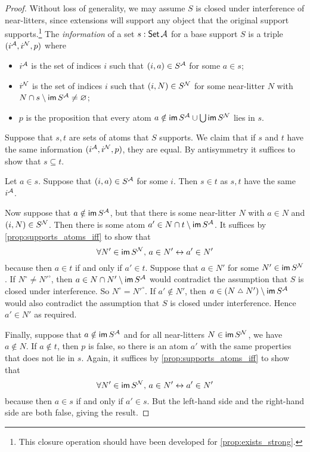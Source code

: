 \begin{proof}
  Without loss of generality, we may assume \( S \) is closed under interference of near-litters, since extensions will support any object that the original support supports.\footnote{This closure operation should have been developed for \cref{prop:exists_strong}.}
  The \emph{information} of a set \( s : \operatorname{\mathsf{Set}} {\mathcal A} \) for a base support \( S \) is a triple \( (i^{\mathcal A}, i^{\mathcal N}, p) \) where
  \begin{itemize}
    \item \( i^{\mathcal A} \) is the set of indices \( i \) such that \( (i, a) \in S^{\mathcal A} \) for some \( a \in s \);
    \item \( i^{\mathcal N} \) is the set of indices \( i \) such that \( (i, N) \in S^{\mathcal N} \) for some near-litter \( N \) with \( N \cap s \setminus \operatorname{\mathsf{im}} S^{\mathcal A} \neq \varnothing \);
    \item \( p \) is the proposition that every atom \( a \notin \operatorname{\mathsf{im}} S^{\mathcal A} \cup \bigcup \operatorname{\mathsf{im}} S^{\mathcal N} \) lies in \( s \).
  \end{itemize}
  Suppose that \( s, t \) are sets of atoms that \( S \) supports.
  We claim that if \( s \) and \( t \) have the same information \( (i^{\mathcal A}, i^{\mathcal N}, p) \), they are equal.
  By antisymmetry it suffices to show that \( s \subseteq t \).

  Let \( a \in s \).
  Suppose that \( (i, a) \in S^{\mathcal A} \) for some \( i \).
  Then \( s \in t \) as \( s, t \) have the same \( i^{\mathcal A} \).

  Now suppose that \( a \notin \operatorname{\mathsf{im}} S^{\mathcal A} \), but that there is some near-litter \( N \) with \( a \in N \) and \( (i, N) \in S^{\mathcal N} \).
  Then there is some atom \( a' \in N \cap t \setminus \operatorname{\mathsf{im}} S^{\mathcal A} \).
  It suffices by \cref{prop:supports_atoms_iff} to show that
  \[ \forall N' \in \operatorname{\mathsf{im}} S^{\mathcal N},\, a \in N' \leftrightarrow a' \in N' \]
  because then \( a \in t \) if and only if \( a' \in t \).
  Suppose that \( a \in N' \) for some \( N' \in \operatorname{\mathsf{im}} S^{\mathcal N} \).
  If \( N^\circ \neq {N'}^\circ \), then \( a \in N \cap N' \setminus \operatorname{\mathsf{im}} S^{\mathcal A} \) would contradict the assumption that \( S \) is closed under interference.
  So \( N^\circ = {N'}^\circ \).
  If \( a' \notin N' \), then \( a \in (N \symmdiff N') \setminus \im S^\Atom \) would also contradict the assumption that \( S \) is closed under interference.
  Hence \( a' \in N' \) as required.

  Finally, suppose that \( a \notin \operatorname{\mathsf{im}} S^{\mathcal A} \) and for all near-litters \( N \in \operatorname{\mathsf{im}} S^{\mathcal N} \), we have \( a \notin N \).
  If \( a \notin t \), then \( p \) is false, so there is an atom \( a' \) with the same properties that does not lie in \( s \).
  Again, it suffices by \cref{prop:supports_atoms_iff} to show that
  \[ \forall N' \in \operatorname{\mathsf{im}} S^{\mathcal N},\, a \in N' \leftrightarrow a' \in N' \]
  because then \( a \in s \) if and only if \( a' \in s \).
  But the left-hand side and the right-hand side are both false, giving the result.


\end{proof}
